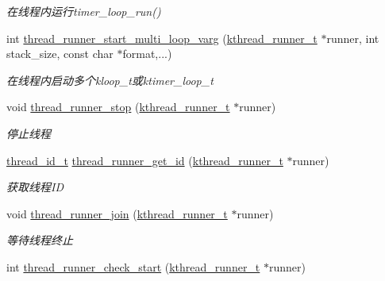 \begin{DoxyCompactItemize}
\begin{DoxyCompactList}\small\item\em 在线程内运行timer\+\_\+loop\+\_\+run() \end{DoxyCompactList}\item 
int \hyperlink{a00138_ga80fabbe64d1fc33e81053e51f69772d2_ga80fabbe64d1fc33e81053e51f69772d2}{thread\+\_\+runner\+\_\+start\+\_\+multi\+\_\+loop\+\_\+varg} (\hyperlink{a00066_a4f78c259c9527c821f1a6f87495dd339_a4f78c259c9527c821f1a6f87495dd339}{kthread\+\_\+runner\+\_\+t} $\ast$runner, int stack\+\_\+size, const char $\ast$format,...)
\begin{DoxyCompactList}\small\item\em 在线程内启动多个kloop\+\_\+t或ktimer\+\_\+loop\+\_\+t \end{DoxyCompactList}\item 
void \hyperlink{a00138_gac8644b2d2ca5580e0cac7378154ae2e0_gac8644b2d2ca5580e0cac7378154ae2e0}{thread\+\_\+runner\+\_\+stop} (\hyperlink{a00066_a4f78c259c9527c821f1a6f87495dd339_a4f78c259c9527c821f1a6f87495dd339}{kthread\+\_\+runner\+\_\+t} $\ast$runner)
\begin{DoxyCompactList}\small\item\em 停止线程 \end{DoxyCompactList}\item 
\hyperlink{a00066_ad0ada5642d10ce71bdd90816182f9b79_ad0ada5642d10ce71bdd90816182f9b79}{thread\+\_\+id\+\_\+t} \hyperlink{a00138_ga1f1e994ba4c42e91e4d4b120aa8eb970_ga1f1e994ba4c42e91e4d4b120aa8eb970}{thread\+\_\+runner\+\_\+get\+\_\+id} (\hyperlink{a00066_a4f78c259c9527c821f1a6f87495dd339_a4f78c259c9527c821f1a6f87495dd339}{kthread\+\_\+runner\+\_\+t} $\ast$runner)
\begin{DoxyCompactList}\small\item\em 获取线程\+I\+D \end{DoxyCompactList}\item 
void \hyperlink{a00138_gad9d9269c695d6bd683c856479d525eb7_gad9d9269c695d6bd683c856479d525eb7}{thread\+\_\+runner\+\_\+join} (\hyperlink{a00066_a4f78c259c9527c821f1a6f87495dd339_a4f78c259c9527c821f1a6f87495dd339}{kthread\+\_\+runner\+\_\+t} $\ast$runner)
\begin{DoxyCompactList}\small\item\em 等待线程终止 \end{DoxyCompactList}\item 
int \hyperlink{a00138_ga3a56e5d1203f6697a6579202919aa048_ga3a56e5d1203f6697a6579202919aa048}{thread\+\_\+runner\+\_\+check\+\_\+start} (\hyperlink{a00066_a4f78c259c9527c821f1a6f87495dd339_a4f78c259c9527c821f1a6f87495dd339}{kthread\+\_\+runner\+\_\+t} $\ast$runner)

\end{DoxyCompactItemize}
